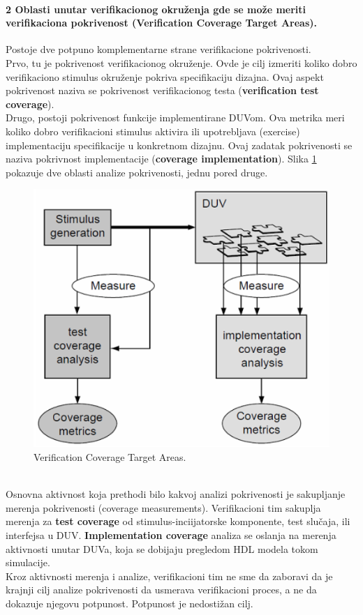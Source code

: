 \documentclass[a4paper, 12pt]{article}
\begin{document}
\paragraph{2 Oblasti unutar verifikacionog okruženja gde se može meriti verifikaciona pokrivenost (Verification Coverage Target Areas).}
\hfill \break
\indent Postoje dve potpuno komplementarne strane verifikacione pokrivenosti.\\
\indent Prvo, tu je pokrivenost verifikacionog okruženje. Ovde je cilj izmeriti koliko dobro verifikaciono stimulus okruženje pokriva specifikaciju dizajna. Ovaj aspekt pokrivenost naziva se pokrivenost verifikacionog testa (\textbf{verification test coverage}).\\
\indent Drugo, postoji pokrivenost funkcije implementirane DUVom. Ova metrika meri koliko dobro verifikacioni stimulus aktivira ili upotrebljava (exercise) implementaciju specifikacije u konkretnom dizajnu. Ovaj zadatak pokrivenosti se naziva pokrivnost implementacije (\textbf{coverage implementation}). Slika \ref{img-p10-1} pokazuje dve oblasti analize pokrivenosti, jednu pored druge.
\begin{figure}[h!]
\centering
\includegraphics[scale=0.6]{img-p10-1.png}
\caption{Verification Coverage Target Areas.}
\label{img-p10-1}
\end{figure}
\\ \indent Osnovna aktivnost koja prethodi bilo kakvoj analizi pokrivenosti je sakupljanje merenja pokrivenosti (coverage measurements). Verifikacioni tim sakuplja merenja za \textbf{test coverage} od stimulus-inciijatorske komponente, test slučaja, ili interfejsa u DUV. \textbf{Implementation coverage} analiza se oslanja na merenja aktivnosti unutar DUVa, koja se dobijaju pregledom HDL modela tokom simulacije.\\
\indent Kroz aktivnosti merenja i analize, verifikacioni tim ne sme da zaboravi da je krajnji cilj analize pokrivenosti da usmerava verifikacioni proces, a ne da dokazuje njegovu potpunost. Potpunost je nedostižan cilj.
\end{document}
